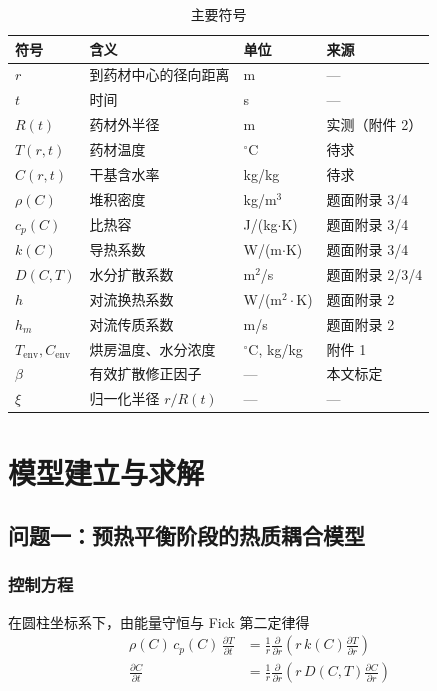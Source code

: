 \documentclass[withoutpreface,bwprint]{cumcmthesis}
\begin{document}
\begin{table}[htbp]
  \centering
  \caption{主要符号}
  \label{tab:symbols}
  \small
  \begin{tabular}{@{}llll@{}}
    \toprule
    符号 & 含义 & 单位 & 来源 \\
    \midrule
    $r$ & 到药材中心的径向距离 & m & --- \\
    $t$ & 时间 & s & --- \\
    $R(t)$ & 药材外半径 & m & 实测（附件 2） \\
    $T(r,t)$ & 药材温度 & $^\circ$C & 待求 \\
    $C(r,t)$ & 干基含水率 & kg/kg & 待求 \\
    $\rho(C)$ & 堆积密度 & kg/m$^3$ & 题面附录 3/4 \\
    $c_p(C)$ & 比热容 & J/(kg$\cdot$K) & 题面附录 3/4 \\
    $k(C)$ & 导热系数 & W/(m$\cdot$K) & 题面附录 3/4 \\
    $D(C,T)$ & 水分扩散系数 & m$^2$/s & 题面附录 2/3/4 \\
    $h$ & 对流换热系数 & W/(m$^2\cdot$K) & 题面附录 2 \\
    $h_m$ & 对流传质系数 & m/s & 题面附录 2 \\
    $T_{\text{env}},C_{\text{env}}$ & 烘房温度、水分浓度 & $^\circ$C, kg/kg & 附件 1 \\
    $\beta$ & 有效扩散修正因子 & --- & 本文标定 \\
    $\xi$ & 归一化半径 $r/R(t)$ & --- & --- \\
    \bottomrule
  \end{tabular}
\end{table}

\section{模型建立与求解}

\subsection{问题一：预热平衡阶段的热质耦合模型}

\subsubsection{控制方程}
在圆柱坐标系下，由能量守恒与 Fick 第二定律得
\begin{align}
  \rho(C)\,c_p(C)\,\frac{\partial T}{\partial t}
    &= \frac{1}{r}\frac{\partial}{\partial r}\!\left(r\,k(C)\frac{\partial T}{\partial r}\right)
    \label{eq:heat}\\[2pt]
  \frac{\partial C}{\partial t}
    &= \frac{1}{r}\frac{\partial}{\partial r}\!\left(r\,D(C,T)\frac{\partial C}{\partial r}\right)
    \label{eq:mass}
\end{align}
\end{document}
